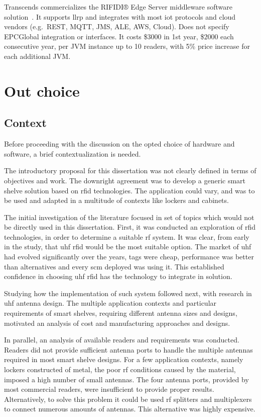 Transcends commercializes the RIFIDI® Edge Server middleware software solution~\cite{RIFIDIEdgeServer2015}. It supports \ac{llrp} and integrates with most \ac{iot} protocols and cloud vendors (e.g.\ REST, MQTT, JMS, ALE, AWS, Cloud). Does not specify EPCGlobal integration or interfaces. It costs \$$3000$ in 1st year, \$$2000$ each consecutive year, per JVM instance up to 10 readers, with 5\% price increase for each additional JVM.

\section{Out choice} \label{sec:ourchoice}

\subsection{Context}

Before proceeding with the discussion on the opted choice of hardware and software, a brief contextualization is needed.

The introductory proposal for this dissertation was not clearly defined in terms of objectives and work. The downright agreement was to develop a generic smart shelve solution based on \ac{rfid} technologies. The application could vary, and was to be used and adapted in a multitude of contexts like lockers and cabinets.

The initial investigation of the literature focused in set of topics which would not be directly used in this dissertation.
First, it was conducted an exploration of \ac{rfid} technologies, in order to determine a suitable \ac{rf} system. It was clear, from early in the study, that \ac{uhf} \ac{rfid} would be the most suitable option. The market of \ac{uhf} had evolved significantly over the years, tags were cheap, performance was better than alternatives and every \ac{scm} deployed was using it. This established confidence in choosing \ac{uhf} \ac{rfid} has the technology to integrate in solution.

Studying how the implementation of such system followed next, with research in \ac{uhf} antenna design. The multiple application contexts and particular requirements of smart shelves, requiring different antenna sizes and designs, motivated an analysis of cost and manufacturing approaches and designs.

In parallel, an analysis of available readers and requirements was conducted.
Readers did not provide sufficient antenna ports to handle the multiple antennas required in most smart shelve designs.
For a few application contexts, namely lockers constructed of metal, the poor \ac{rf} conditions caused by the material, imposed a high number of small antennas. The four antenna ports, provided by most commercial readers, were insufficient to provide proper results. 
Alternatively, to solve this problem it could be used \ac{rf} splitters and multiplexers to connect numerous amounts of antennas. This alternative was highly expensive.

